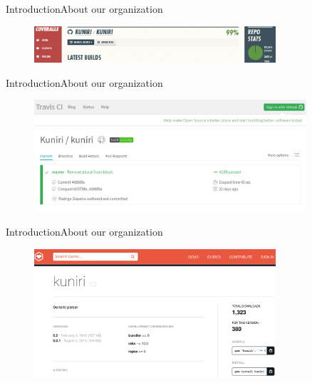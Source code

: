 \documentclass[10pt]{beamer}
\begin{document}
\begin{frame}{Introduction}{About our organization}
  \begin{figure}[overview]
    \includegraphics[width=0.8\textwidth]{images/coveralls.png}
  \end{figure}
\end{frame}

\begin{frame}{Introduction}{About our organization}
  \begin{figure}[overview]
    \includegraphics[width=0.9\textwidth]{images/travisci.png}
  \end{figure}
\end{frame}

\begin{frame}{Introduction}{About our organization}
  \begin{figure}[overview]
    \includegraphics[width=0.8\textwidth]{images/rubygems.png}
  \end{figure}
\end{frame}

\end{document}
